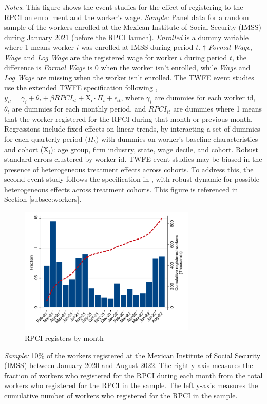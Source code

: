 \documentclass[oneside,11pt]{article}
\begin{document}
\scriptsize{\textit{Notes}: This figure shows the event studies for the effect of registering to the RPCI on enrollment and the worker's wage. \textit{Sample:} Panel data for a random sample of the workers enrolled at the Mexican Institute of Social Security (IMSS) during January 2021 (before the RPCI launch). \textit{Enrolled} is a dummy variable where 1 means worker $i$ was enrolled at IMSS during period $t$. $\dagger$ \textit{Formal Wage}, \textit{Wage} and \textit{Log Wage} are the registered wage for worker $i$ during period $t$, the difference is \textit{Formal Wage} is 0 when the worker isn't enrolled, while \textit{Wage} and \textit{Log Wage} are missing when the worker isn't enrolled. The TWFE event studies use the extended TWFE specification following \cite{wooldridge2021two}, $y_{it} = \gamma_{i} + \theta_{t}+ \beta RPCI_{it} + \mathrm{X_i}\cdot\Pi_t +\epsilon_{it}$, where $\gamma_{i}$ are dummies for each worker id, $\theta_{t}$ are dummies for each monthly period, and $RPCI_{it}$ are dummies where 1 means that the worker registered for the RPCI during that month or previous month. Regressions include fixed effects on linear trends, by interacting a set of dummies for each quarterly period ($\Pi_t)$ with dummies on worker's baseline characteristics and cohort ($\mathrm{X_i}$): age group, firm industry, state, wage decile, and cohort. Robust standard errors clustered by worker id. TWFE event studies may be biased in the presence of heterogeneous treatment effects across cohorts. To address this, the second event study follows the specification in \cite{de2020two}, with robust dynamic for possible heterogeneous effects across treatment cohorts. This figure is referenced in \hyperref[subsec:workers]{Section} \ref{subsec:workers}.}


\begin{figure}[H]
    \caption{RPCI registers by month}
    \label{hist_download}
    \begin{center}
    \includegraphics[width=0.75\textwidth]{04_Figures/muestra_1porciento/hist_download_month.pdf}
    \end{center}
\end{figure}
\scriptsize{
\noindent \textit{Sample:} 10\% of the workers registered at the Mexican Institute of Social Security (IMSS) between January 2020 and August 2022. The right y-axis measures the fraction of workers who registered for the RPCI during each month from the total workers who registered for the RPCI in the sample. The left y-axis measures the cumulative number of workers who registered for the RPCI in the sample.
}
\end{document}
